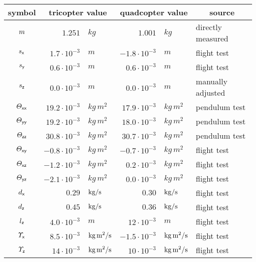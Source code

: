 \begin{table}
 \centering
 \setlength{\tabcolsep}{.1em}
 \begin{tabular}{crlrll}
  \toprule
  symbol & \multicolumn{2}{c}{tricopter value} & \multicolumn{2}{c}{quadcopter value} & \multicolumn{1}{c}{source} \\
  \midrule
  $\quad m\quad$ & $1.251$&$\unit{kg}$ & $1.001$&$\unit{kg}$ & directly measured
  \\[1ex]
  $s_{\mathsf{x}}$ & $ 1.7 \cdot 10^{-3}$&$\unit{m}$ & $ -1.8 \cdot 10^{-3}$&$\unit{m}$ & flight test \\
  $s_{\mathsf{y}}$ & $ 0.6 \cdot 10^{-3}$&$\unit{m}$ & $ 0.6 \cdot 10^{-3}$&$\unit{m}$ & flight test \\
  $s_{\mathsf{z}}$ & $ 0.0 \cdot 10^{-3}$&$\unit{m}$ & $ 0.0 \cdot 10^{-3}$&$\unit{m}$ & manually adjusted
  \\[1ex]
  $\varTheta_{\mathsf{x}\mathsf{x}}$ & \phantom{|} \qquad $19.2 \cdot 10^{-3}$&$\unit{kg}\,\unit{m}^2$ \qquad \phantom{|} & \phantom{|} \qquad $17.9 \cdot 10^{-3}$&$\unit{kg}\,\unit{m}^2$ \qquad \phantom{|} & pendulum test\\
  $\varTheta_{\mathsf{y}\mathsf{y}}$ & $19.2 \cdot 10^{-3}$&$\unit{kg}\,\unit{m}^2$ & $18.0 \cdot 10^{-3}$&$\unit{kg}\,\unit{m}^2$ & pendulum test \\
  $\varTheta_{\mathsf{z}\mathsf{z}}$ & $30.8 \cdot 10^{-3}$&$\unit{kg}\,\unit{m}^2$ & $30.7 \cdot 10^{-3}$&$\unit{kg}\,\unit{m}^2$ & pendulum test \\
  $\varTheta_{\mathsf{x}\mathsf{y}}$ & $-0.8 \cdot 10^{-3}$&$\unit{kg}\,\unit{m}^2$ & $-0.7 \cdot 10^{-3}$&$\unit{kg}\,\unit{m}^2$ & flight test \\
  $\varTheta_{\mathsf{x}\mathsf{z}}$ & $-1.2 \cdot 10^{-3}$&$\unit{kg}\,\unit{m}^2$ & $ 0.2 \cdot 10^{-3}$&$\unit{kg}\,\unit{m}^2$ & flight test \\
  $\varTheta_{\mathsf{y}\mathsf{z}}$ & $-2.1 \cdot 10^{-3}$&$\unit{kg}\,\unit{m}^2$ & $ 0.0 \cdot 10^{-3}$&$\unit{kg}\,\unit{m}^2$ & flight test 
  \\[1ex]
  $d_{\mathsf{x}}$ & $0.29 $&$\text{kg} / \text{s}$ & $0.30 $&$\text{kg} / \text{s}$ & flight test \\
  $d_{\mathsf{z}}$ & $0.45 $&$\text{kg} / \text{s}$ & $0.36 $&$\text{kg} / \text{s}$ & flight test \\
  $l_{\mathsf{z}}$ & $4.0 \cdot 10^{-3}$&$\unit{m}$ & $12 \cdot 10^{-3}$&$\unit{m}$ & flight test \\
  $\varUpsilon_{\mathsf{x}}$ & $8.5 \cdot 10^{-3}$&$\text{kg}\,\text{m}^2 / \text{s}$ & $-1.5 \cdot 10^{-3}$&$\text{kg}\,\text{m}^2 / \text{s}$ & flight test \\
  $\varUpsilon_{\mathsf{z}}$ & $14 \cdot 10^{-3}$&$\text{kg}\,\text{m}^2 / \text{s}$ & $10 \cdot 10^{-3}$&$\text{kg}\,\text{m}^2 / \text{s}$ & flight test

\end{tabular}
\end{table}
